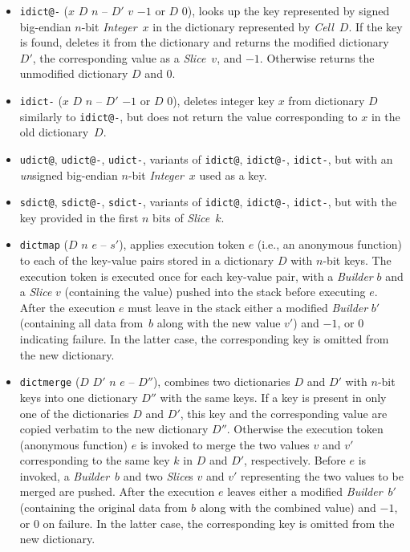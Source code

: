 \documentclass[12pt,oneside]{article}
\begin{document}
\begin{itemize}
\item {\tt idict@-} ($x$ $D$ $n$ -- $D'$ $v$ $-1$ or $D$ $0$), looks up the key represented by signed big-endian $n$-bit {\em Integer\/}~$x$ in the dictionary represented by {\em Cell\/}~$D$. If the key is found, deletes it from the dictionary and returns the modified dictionary $D'$, the corresponding value as a {\em Slice\/}~$v$, and $-1$. Otherwise returns the unmodified dictionary $D$ and $0$.
\item {\tt idict-} ($x$ $D$ $n$ -- $D'$ $-1$ or $D$ $0$), deletes integer key $x$ from dictionary $D$ similarly to {\tt idict@-}, but does not return the value corresponding to $x$ in the old dictionary~$D$.
\item {\tt udict@}, {\tt udict@-}, {\tt udict-}, variants of {\tt idict@}, {\tt idict@-}, {\tt idict-}, but with an {\em un}signed big-endian $n$-bit {\em Integer\/}~$x$ used as a key.
\item {\tt sdict@}, {\tt sdict@-}, {\tt sdict-}, variants of {\tt idict@}, {\tt idict@-}, {\tt idict-}, but with the key provided in the first $n$ bits of {\em Slice\/}~$k$.
\item {\tt dictmap} ($D$ $n$ $e$ -- $s'$), applies execution token $e$ (i.e., an anonymous function) to each of the key-value pairs stored in a dictionary $D$ with $n$-bit keys. The execution token is executed once for each key-value pair, with a {\em Builder\/} $b$ and a {\em Slice\/} $v$ (containing the value) pushed into the stack before executing $e$. After the execution $e$ must leave in the stack either a modified {\em Builder\/} $b'$ (containing all data from~$b$ along with the new value $v'$) and $-1$, or $0$ indicating failure. In the latter case, the corresponding key is omitted from the new dictionary.
\item {\tt dictmerge} ($D$ $D'$ $n$ $e$ -- $D''$), combines two dictionaries $D$ and $D'$ with $n$-bit keys into one dictionary $D''$ with the same keys. If a key is present in only one of the dictionaries $D$ and $D'$, this key and the corresponding value are copied verbatim to the new dictionary $D''$. Otherwise the execution token (anonymous function) $e$ is invoked to merge the two values $v$ and $v'$ corresponding to the same key $k$ in $D$ and $D'$, respectively. Before $e$ is invoked, a {\em Builder\/}~$b$ and two {\em Slice}s $v$ and $v'$ representing the two values to be merged are pushed. After the execution $e$ leaves either a modified {\em Builder\/}~$b'$ (containing the original data from $b$ along with the combined value) and $-1$, or $0$ on failure. In the latter case, the corresponding key is omitted from the new dictionary.
\end{itemize}
\end{document}
